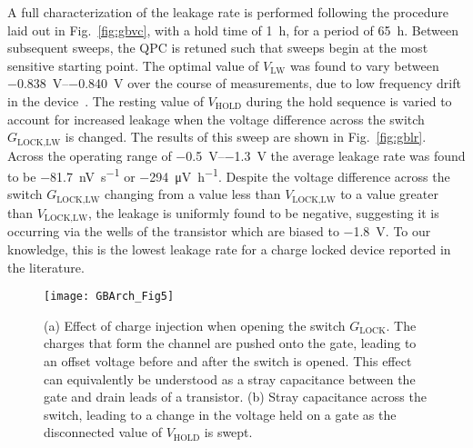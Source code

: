 A full characterization of the leakage rate is performed following the procedure laid out in Fig.~\ref{fig:gbvc}, with a hold time of \SI{1}{\hour}, for a period of \SI{65}{\hour}. Between subsequent sweeps, the QPC is retuned such that sweeps begin at the most sensitive starting point. The optimal value of $V_\textrm{LW}$ was found to vary between \SIrange{-0.838}{-0.840}{\volt} over the course of measurements, due to low frequency drift in the device~\cite{PhysRevApplied.9.034008}. The resting value of $V_\textrm{HOLD}$ during the hold sequence is varied to account for increased leakage when the voltage difference across the switch $G_\textrm{LOCK,LW}$ is changed. The results of this sweep are shown in Fig.~\ref{fig:gblr}. Across the operating range of \SIrange{-0.5}{-1.3}{\volt} the average leakage rate was found to be \SI{-81.7}{\nano\volt\per\second} or \SI{-294}{\micro\volt\per\hour}. Despite the voltage difference across the switch $G_\textrm{LOCK,LW}$ changing from a value less than $V_\textrm{LOCK,LW}$ to a value greater than $V_\textrm{LOCK,LW}$, the leakage is uniformly found to be negative, suggesting it is occurring via the wells of the transistor which are biased to \SI{-1.8}{\volt}. To our knowledge, this is the lowest leakage rate for a charge locked device reported in the literature.

\begin{figure}
  \texttt{[image: GBArch\_Fig5]}
  \caption[Static corrections to hold voltage]
  {\label{fig:gbcorr} (a) Effect of charge injection when opening the switch $G_\textrm{LOCK}$. The charges that form the channel are pushed onto the gate, leading to an offset voltage before and after the switch is opened. This effect can equivalently be understood as a stray capacitance between the gate and drain leads of a transistor. (b) Stray capacitance across the switch, leading to a change in the voltage held on a gate as the disconnected value of $V_\textrm{HOLD}$ is swept.}
\end{figure}

